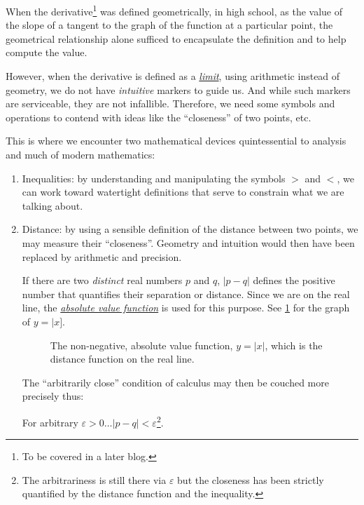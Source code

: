 \documentclass[
  a4paper,
]{article}
\begin{document}
When the derivative\footnote{To be covered in a later blog.} was defined
geometrically, in high school, as the value of the slope of a tangent to
the graph of the function at a particular point, the geometrical
relationship alone sufficed to encapsulate the definition and to help
compute the value.

However, when the derivative is defined as a
\href{https://en.wikipedia.org/wiki/Limit_(mathematics)}{\emph{limit}},
using arithmetic instead of geometry, we do not have \emph{intuitive}
markers to guide us. And while such markers are serviceable, they are
not infallible. Therefore, we need some symbols and operations to
contend with ideas like the ``closeness'' of two points, etc.

This is where we encounter two mathematical devices quintessential to
analysis and much of modern mathematics:

\begin{enumerate}
\def\labelenumi{\alph{enumi}.}
\item
  Inequalities: by understanding and manipulating the symbols \(>\) and
  \(<\), we can work toward watertight definitions that serve to
  constrain what we are talking about.
\item
  Distance: by using a sensible definition of the distance between two
  points, we may measure their ``closeness''. Geometry and intuition
  would then have been replaced by arithmetic and precision.

  If there are two \emph{distinct} real numbers \(p\) and \(q\),
  \(|p - q|\) defines the positive number that quantifies their
  separation or distance. Since we are on the real line, the
  \href{https://mathworld.wolfram.com/AbsoluteValue.html}{\emph{absolute
  value function}} is used for this purpose. See \cref{fig:absolute} for
  the graph of \(y = |x]\).

  \begin{figure}
  \centering
  
  \caption{The non-negative, absolute value function, \(y = |x|\), which
  is the distance function on the real line.}\label{fig:absolute}
  \end{figure}

  The ``arbitrarily close'' condition of calculus may then be couched
  more precisely thus:

  For arbitrary
  \(\varepsilon > 0 \dots | p - q | < \varepsilon\)\footnote{The
    arbitrariness is still there via \(\varepsilon\) but the closeness
    has been strictly quantified by the distance function and the
    inequality.}.
\end{enumerate}
\end{document}
